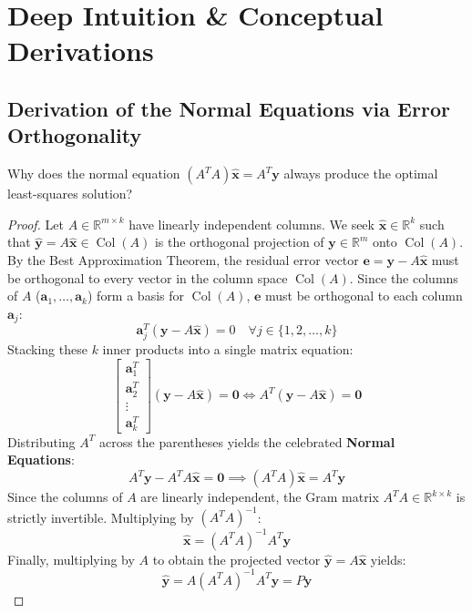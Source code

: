 \section{Deep Intuition \& Conceptual Derivations}

\subsection{Derivation of the Normal Equations via Error Orthogonality}

Why does the normal equation $(A^T A)\hat{\mathbf{x}} = A^T \mathbf{y}$ always produce the optimal least-squares solution?
\begin{proof}
Let $A \in \mathbb{R}^{m \times k}$ have linearly independent columns. We seek $\hat{\mathbf{x}} \in \mathbb{R}^k$ such that $\hat{\mathbf{y}} = A\hat{\mathbf{x}} \in \operatorname{Col}(A)$ is the orthogonal projection of $\mathbf{y} \in \mathbb{R}^m$ onto $\operatorname{Col}(A)$.
By the Best Approximation Theorem, the residual error vector $\mathbf{e} = \mathbf{y} - A\hat{\mathbf{x}}$ must be orthogonal to every vector in the column space $\operatorname{Col}(A)$.
Since the columns of $A$ ($\mathbf{a}_1, \dots, \mathbf{a}_k$) form a basis for $\operatorname{Col}(A)$, $\mathbf{e}$ must be orthogonal to each column $\mathbf{a}_j$:
\begin{equation*}
\mathbf{a}_j^T (\mathbf{y} - A\hat{\mathbf{x}}) = 0 \quad \forall j \in \{1, 2, \dots, k\}
\end{equation*}
Stacking these $k$ inner products into a single matrix equation:
\begin{equation*}
\begin{bmatrix} \mathbf{a}_1^T \\ \mathbf{a}_2^T \\ \vdots \\ \mathbf{a}_k^T \end{bmatrix} (\mathbf{y} - A\hat{\mathbf{x}}) = \mathbf{0} \iff A^T (\mathbf{y} - A\hat{\mathbf{x}}) = \mathbf{0}
\end{equation*}
Distributing $A^T$ across the parentheses yields the celebrated \textbf{Normal Equations}:
\begin{equation}
A^T \mathbf{y} - A^T A \hat{\mathbf{x}} = \mathbf{0} \implies (A^T A)\hat{\mathbf{x}} = A^T \mathbf{y}
\end{equation}
Since the columns of $A$ are linearly independent, the Gram matrix $A^T A \in \mathbb{R}^{k \times k}$ is strictly invertible. Multiplying by $(A^T A)^{-1}$:
\begin{equation}
\hat{\mathbf{x}} = (A^T A)^{-1} A^T \mathbf{y}
\end{equation}
Finally, multiplying by $A$ to obtain the projected vector $\hat{\mathbf{y}} = A\hat{\mathbf{x}}$ yields:
\begin{equation}
\hat{\mathbf{y}} = A (A^T A)^{-1} A^T \mathbf{y} = P \mathbf{y}
\end{equation}
\end{proof}

